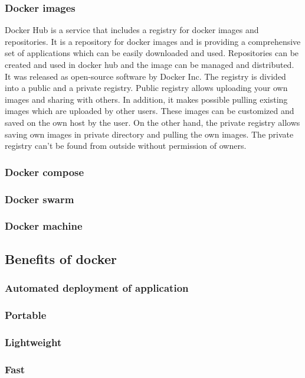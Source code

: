 \subsubsection{Docker images}

Docker Hub is a service that includes a registry for docker images and repositories. It is a repository for docker images and is providing a comprehensive set of applications which can be easily downloaded and used. Repositories can be created and used in docker hub and the image can be managed and distributed. It was released as open-source software by Docker Inc. The registry is divided into a public and a private registry. Public registry allows uploading your own images and sharing with others. In addition, it makes possible pulling existing images which are uploaded by other users. These images can be customized and saved on the own host by the user. On the other hand, the private registry allows saving own images in private directory and pulling the own images. The private registry can’t be found from outside without permission of owners.

\subsubsection{Docker compose}
\subsubsection{Docker swarm}
\subsubsection{Docker machine}
\subsection{Benefits of docker}
\subsubsection{Automated deployment of application}
\subsubsection{Portable}
\subsubsection{Lightweight}
\subsubsection{Fast}


